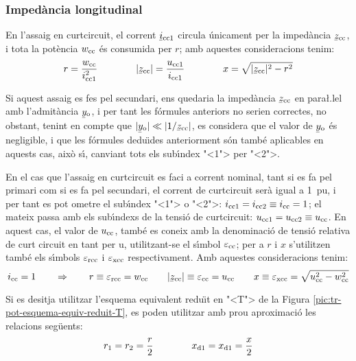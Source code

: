\subsubsection{Imped\`{a}ncia longitudinal}

En l'assaig en curtcircuit, el corrent $\cmplx{i}\ped{cc1}$ circula
\'{u}nicament per la imped\`{a}ncia $\cmplx{z}\ped{cc}$, i tota la pot\`{e}ncia
$w_\mathrm{cc}$ \'{e}s consumida per $r$; amb aquestes consideracions tenim:
\begin{equation}
    r = \frac{w\ped{cc}}{i\ped{cc1}^2} \qquad\qquad
    |\cmplx{z}\ped{cc}| = \frac{u\ped{cc1}}{i\ped{cc1}} \qquad\qquad
    x = \sqrt{|\cmplx{z}\ped{cc}|^2 - r^2}
\end{equation}

Si aquest assaig es fes pel secundari, ens quedaria la imped\`{a}ncia
$\cmplx{z}\ped{cc}$ en para{\l.l}el amb l'admit\`{a}ncia
$\cmplx{y}\ped{o}$, i per tant les f\'{o}rmules anteriors no serien
correctes, no obstant, tenint en compte que $|\cmplx{y}\ped{o}| \ll
|1/\cmplx{z}\ped{cc}|$, es considera que el valor de
$\cmplx{y}\ped{o}$ \'{e}s negligible, i que les f\'{o}rmules dedu\"{\i}des
anteriorment s\'{o}n tamb\'{e} aplicables en aquests cas, aix\`{o} s\'{\i}, canviant
tots els sub\'{\i}ndex {"<}1{">} per {"<}2{">}.

En el cas que l'assaig en curtcircuit es faci a corrent nominal,
tant  si es fa pel primari  com si es fa pel secundari, el corrent
de curtcircuit ser\`{a} igual a \SI{1}{pu}, i per tant es pot ometre el
sub\'{\i}ndex {"<}1{">} o {"<}2{">}: $i_\mathrm{cc1} = i_\mathrm{cc2} \equiv i_\mathrm{cc} = 1$;
el mateix passa amb els sub\'{\i}ndexs de la tensi\'{o} de curtcircuit:
$u_\mathrm{cc1} = u_\mathrm{cc2} \equiv u_\mathrm{cc}$. En aquest cas, el valor
de $u_\mathrm{cc}$, tamb\'{e} es coneix amb la denominaci\'{o} de
tensi\'{o} relativa de curt  circuit en tant per u, utilitzant-se  el
s\'{\i}mbol $\varepsilon_\mathrm{cc}$; per a $r$ i $x$ s'utilitzen tamb\'{e} els
s\'{\i}mbols $\varepsilon_\mathrm{rcc}$ i $\varepsilon_\mathrm{xcc}$
respectivament. Amb aquestes consideracions tenim:
\begin{equation}
    i\ped{cc} = 1 \qquad \Rightarrow \qquad r \equiv \varepsilon\ped{rcc} = w\ped{cc} \qquad
    |\cmplx{z}\ped{cc}| \equiv \varepsilon\ped{cc} = u\ped{cc} \qquad
    x \equiv \varepsilon\ped{xcc} = \sqrt{u\ped{cc}^2 - w\ped{cc}^2}
    \label{eq:assaig-cc-nomianl}
\end{equation}

Si es desitja utilitzar l'esquema equivalent redu\"{\i}t en {"<}T{">} de la Figura \vref{pic:tr-pot-esquema-equiv-reduit-T}, es poden utilitzar amb prou aproximaci\'{o} les relacions seg\"{u}ents:
\begin{equation}
    r_1 = r_2 = \frac{r}{2} \qquad\qquad x_\mathrm{d1} = x_\mathrm{d1} = \frac{x}{2}
\end{equation}


